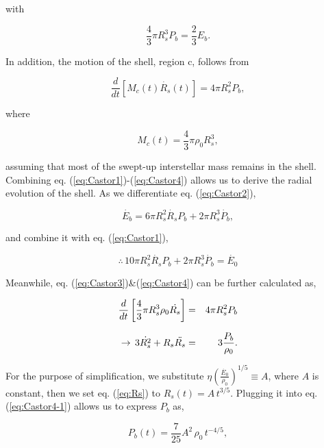 \noi with

\begin{equation}\label{eq:Castor2}
   \frac{4}{3} \pi R_{s}^3 P_{b} = \frac{2}{3} E_{b}.
\end{equation}

In addition, the motion of the shell, region c, follows from 

\begin{equation}\label{eq:Castor3}
   \frac{d}{dt} \left[ M_{c}(t) \dot{R_{s}}(t) \right] = 4 \pi R_{s}^{2} P_{b},
\end{equation}

\noi where

\begin{equation}\label{eq:Castor4}
   M_{c}(t) = \frac{4}{3}\pi \rho_{0} R_{s}^3,
\end{equation}

\noi assuming that most of the swept-up interstellar mass remains in the shell. Combining eq. 
(\ref{eq:Castor1})-(\ref{eq:Castor4}) allows us to derive the radial evolution of the shell.
As we differentiate eq. (\ref{eq:Castor2}),

\begin{equation}
   \dot{E_{b}} = 6 \pi R_{s}^{2} \dot{R_{s}} P_{b} + 2 \pi R_{s}^3 \dot{P_{b}},
\end{equation}

\noi and combine it with eq. (\ref{eq:Castor1}),

\begin{equation}\label{eq:Castor1-1}
  \therefore \, 10 \pi R_{s}^{2} \dot{R_{s}} P_{b} + 2 \pi R_{s}^{3} \dot{P_{b}} = \dot{E_{0}}
\end{equation}

Meanwhile, eq. (\ref{eq:Castor3})\&(\ref{eq:Castor4}) can be further calculated as, 

\begin{eqnarray}\label{eq:Castor4-1}
   \frac{d}{dt} \left[ \frac{4}{3}\pi R_{s}^3 \rho_{0} \dot{R_{s}} \right] &=& 4 \pi R_{s}^2 P_{b} \nonumnext
   \rightarrow \, 3 \dot{R_{s}^2} + R_{s} \ddot{R_{s}} &=& 3 \frac{P_{b}}{\rho_{0}}.
\end{eqnarray}

For the purpose of simplification, we substitute $\eta \left( \frac{\dot{E_{0}}}{\rho_{0}}
\right)^{1/5} \equiv A$, where $A$ is constant, then we set eq. (\ref{eq:Rs}) to $R_{s}(t) =
A \, t^{3/5}$. Plugging it into eq. (\ref{eq:Castor4-1}) allows us to express $P_{b}$ as,

\begin{equation}\label{eq:Pb}
   P_{b} (t) = \frac{7}{25} A^{2} \, \rho_{0} \, t^{-4/5},
\end{equation}

